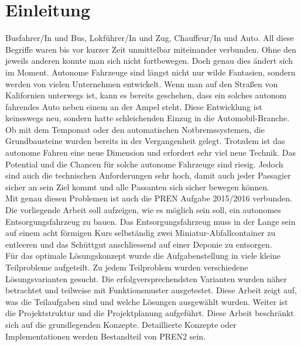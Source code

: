 \section{Einleitung}
Busfahrer/In und Bus, Lokführer/In und Zug, Chauffeur/In und Auto. All diese Begriffe waren bis vor kurzer Zeit unmittelbar miteinander verbunden. Ohne den jeweils anderen konnte man sich nicht fortbewegen. Doch genau dies ändert sich im Moment. Autonome Fahrzeuge sind längst nicht nur wilde Fantasien, sondern werden von vielen Unternehmen entwickelt. Wenn man auf den Straßen von Kalifornien unterwegs ist, kann es bereits geschehen, dass ein solches autonom fahrendes Auto neben einem an der Ampel steht. Diese Entwicklung ist keineswegs neu, sondern hatte schleichenden Einzug in die Automobil-Branche. Ob mit dem Tempomat oder den automatischen Notbremssystemen, die Grundbausteine wurden bereits in der Vergangenheit gelegt.
Trotzdem ist das autonome Fahren eine neue Dimension und erfordert sehr viel neue Technik. Das Potential und die Chancen für solche autonome Fahrzeuge sind riesig. Jedoch sind auch die technischen Anforderungen sehr hoch, damit auch jeder Passagier sicher an sein Ziel kommt und alle Passanten sich sicher bewegen können. \\
Mit genau diesen Problemen ist auch die PREN Aufgabe 2015/2016 verbunden. Die vorliegende Arbeit soll aufzeigen, wie es möglich sein soll, ein autonomes Entsorgungsfahrzeug zu bauen. Das Entsorgungsfahrzeug muss in der Lange sein auf einem acht förmigen Kurs selbständig zwei Miniatur-Abfallcontainer zu entleeren und das Schüttgut anschliessend auf einer Deponie zu entsorgen.\\
Für das optimale Lösungskonzept wurde die Aufgabenstellung in viele kleine Teilprobleme aufgeteilt. Zu jedem Teilproblem wurden verschiedene Lösungsvarianten gesucht. Die erfolgversprechendsten Varianten wurden näher betrachtet und teilweise mit Funktionsmuster ausgetestet. Diese Arbeit zeigt auf, was die Teilaufgaben sind und welche Lösungen ausgewählt wurden. Weiter ist die Projektstruktur und die Projektplanung aufgeführt. Diese Arbeit beschränkt sich auf die grundlegenden Konzepte. Detaillierte Konzepte oder Implementationen werden Bestandteil von PREN2 sein. 
